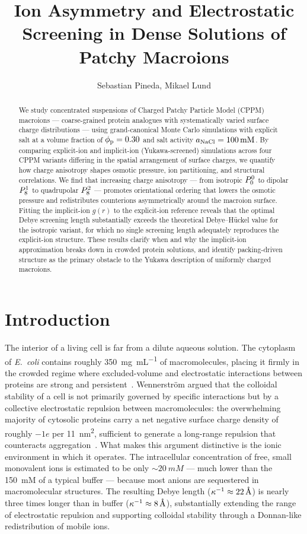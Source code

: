 \documentclass{article}
\title{Ion Asymmetry and Electrostatic Screening in Dense Solutions of Patchy Macroions}
\author{Sebastian Pineda, Mikael Lund}
\date{}
\begin{document}
\maketitle

\begin{abstract}
We study concentrated suspensions of Charged Patchy Particle Model (CPPM) macroions — coarse-grained protein analogues with systematically varied surface charge distributions — using grand-canonical Monte Carlo simulations with explicit  salt at a volume fraction of $\phi_\mathrm{p} = 0.30$ and salt activity $\anacl = \qty{100}{mM}$.
By comparing explicit-ion and implicit-ion (Yukawa-screened) simulations across four CPPM variants differing in the spatial arrangement of surface charges, we quantify how charge anisotropy shapes osmotic pressure, ion partitioning, and structural correlations.
We find that increasing charge anisotropy — from isotropic $P^{0}_{0}$ to dipolar $P^{1}_{8}$ to quadrupolar $P^{2}_{8}$ — promotes orientational ordering that lowers the osmotic pressure and redistributes counterions asymmetrically around the macroion surface.
Fitting the implicit-ion $g(r)$ to the explicit-ion reference reveals that the optimal Debye screening length substantially exceeds the theoretical Debye--Hückel value for the isotropic variant, for which no single screening length adequately reproduces the explicit-ion structure.
These results clarify when and why the implicit-ion approximation breaks down in crowded protein solutions, and identify packing-driven structure as the primary obstacle to the Yukawa description of uniformly charged macroions.
\end{abstract}

\section{\label{sec:intro} Introduction}

The interior of a living cell is far from a dilute aqueous solution.
The cytoplasm of \textit{E.\ coli} contains roughly \qty{350}{\mg\per\mL} of macromolecules, placing it firmly in the crowded regime where excluded-volume and electrostatic interactions between proteins are strong and persistent~\cite{wennerstrom_colloidal_2020}.
Wennerström \etal argued that the colloidal stability of a cell is not primarily governed by specific interactions but by a collective electrostatic repulsion between macromolecules: the overwhelming majority of cytosolic proteins carry a net negative surface charge density of roughly $-1e$ per \qty{11}{\nm\squared}, sufficient to generate a long-range repulsion that counteracts aggregation~\cite{wennerstrom_colloidal_2020}.
What makes this argument distinctive is the ionic environment in which it operates.
The intracellular concentration of free, small monovalent ions is estimated to be only $\sim\!\qty{20}{mM}$ — much lower than the \qty{150}{mM}  of a typical buffer — because most anions are sequestered in macromolecular structures.
The resulting Debye length ($\kappa^{-1} \approx \qty{22}{\angstrom}$) is nearly three times longer than in buffer ($\kappa^{-1} \approx \qty{8}{\angstrom}$), substantially extending the range of electrostatic repulsion and supporting colloidal stability through a Donnan-like redistribution of mobile ions.
\end{document}
